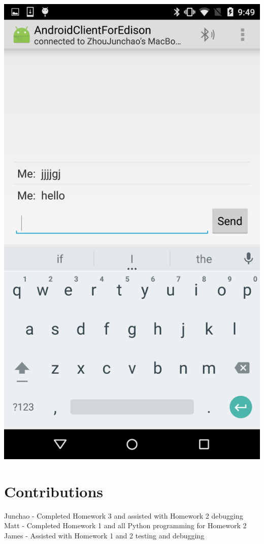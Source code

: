 \documentclass[]{article}
\begin{document}
\includegraphics[keepaspectratio, width=\textwidth]{photo3}

\section{Contributions}
Junchao - Completed Homework 3 and assisted with Homework 2 debugging
Matt - Completed Homework 1 and all Python programming for Homework 2
James - Assisted with Homework 1 and 2 testing and debugging
\end{document}
